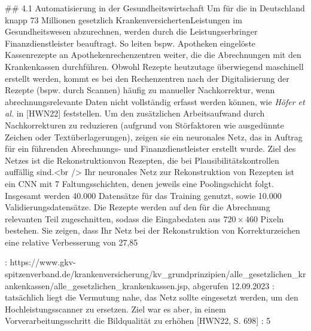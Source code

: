 ## 4.1 Automatisierung in der Gesundheitswirtschaft
Um für die in Deutschland knapp 73 Millionen gesetzlich Krankenversicherten\footnotemark[4] Leistungen im Gesundheitswesen abzurechnen, werden durch die Leistungserbringer Finanzdienstleister beauftragt. So leiten bspw. Apotheken eingelöste Kassenrezepte an Apothekenrechenzentren weiter, die die Abrechnungen mit den Krankenkassen durchführen. Obwohl Rezepte heutzutage überwiegend maschinell erstellt werden, kommt es bei den Rechenzentren nach der Digitalisierung der Rezepte (bspw. durch Scannen) häufig zu manueller Nachkorrektur, wenn abrechnungsrelevante Daten nicht vollständig erfasst werden können, wie \textit{Höfer et al.} in [HWN22] feststellen. Um den zusätzlichen Arbeitsaufwand durch Nachkorrekturen zu reduzieren (aufgrund von Störfaktoren wie ausgedünnte Zeichen oder Textüberlagerungen), zeigen sie ein neuronales Netz, das in Auftrag für ein führenden Abrechnungs- und Finanzdienstleister erstellt wurde. Ziel des Netzes ist die Rekonstruktion\footnotemark[5] von Rezepten, die bei Plausibilitätskontrollen auffällig sind.<br />
Ihr neuronales Netz zur Rekonstruktion von Rezepten ist ein CNN mit 7 Faltungsschichten, denen jeweils eine Poolingschicht folgt. Insgesamt werden 40.000 Datensätze für das Training genutzt, sowie 10.000 Validierungsdatensätze. Die Rezepte werden auf den für die Abrechnung relevanten Teil zugeschnitten, sodass die Eingabedaten aus $720 \times 460$ Pixeln bestehen. Sie zeigen, dass Ihr Netz bei der Rekonstruktion von Korrekturzeichen eine relative Verbesserung von 27,85%

\footnotemark[4]: https://www.gkv-spitzenverband.de/krankenversicherung/kv_grundprinzipien/alle_gesetzlichen_krankenkassen/alle_gesetzlichen_krankenkassen.jsp, abgerufen 12.09.2023
\footnotemark[5]: tatsächlich liegt die Vermutung nahe, das Netz sollte eingesetzt werden, um den Hochleistungsscanner zu ersetzen. Ziel war es aber, in einem Vorverarbeitungsschritt die Bildqualität zu erhöhen [HWN22, S. 698]
\footnotemark[6]: 5%


